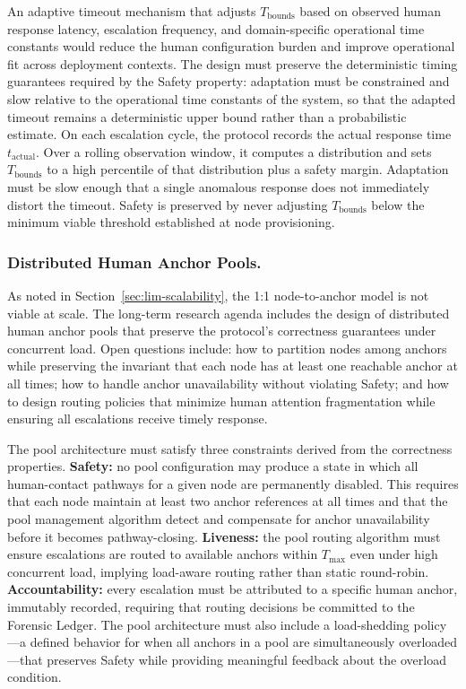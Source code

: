 An adaptive timeout mechanism that adjusts $T_{\text{bounds}}$ based on observed human response latency, escalation frequency, and domain-specific operational time constants would reduce the human configuration burden and improve operational fit across deployment contexts. The design must preserve the deterministic timing guarantees required by the Safety property: adaptation must be constrained and slow relative to the operational time constants of the system, so that the adapted timeout remains a deterministic upper bound rather than a probabilistic estimate. On each escalation cycle, the protocol records the actual response time $t_{\text{actual}}$. Over a rolling observation window, it computes a distribution and sets $T_{\text{bounds}}$ to a high percentile of that distribution plus a safety margin. Adaptation must be slow enough that a single anomalous response does not immediately distort the timeout. Safety is preserved by never adjusting $T_{\text{bounds}}$ below the minimum viable threshold established at node provisioning.

\subsubsection{Distributed Human Anchor Pools.}\label{sec:fw-anchor-pools}

As noted in Section~\ref{sec:lim-scalability}, the 1:1 node-to-anchor model is not viable at scale. The long-term research agenda includes the design of distributed human anchor pools that preserve the protocol's correctness guarantees under concurrent load. Open questions include: how to partition nodes among anchors while preserving the invariant that each node has at least one reachable anchor at all times; how to handle anchor unavailability without violating Safety; and how to design routing policies that minimize human attention fragmentation while ensuring all escalations receive timely response.

The pool architecture must satisfy three constraints derived from the correctness properties. \textbf{Safety:} no pool configuration may produce a state in which all human-contact pathways for a given node are permanently disabled. This requires that each node maintain at least two anchor references at all times and that the pool management algorithm detect and compensate for anchor unavailability before it becomes pathway-closing. \textbf{Liveness:} the pool routing algorithm must ensure escalations are routed to available anchors within $T_{\max}$ even under high concurrent load, implying load-aware routing rather than static round-robin. \textbf{Accountability:} every escalation must be attributed to a specific human anchor, immutably recorded, requiring that routing decisions be committed to the Forensic Ledger. The pool architecture must also include a load-shedding policy---a defined behavior for when all anchors in a pool are simultaneously overloaded---that preserves Safety while providing meaningful feedback about the overload condition.

